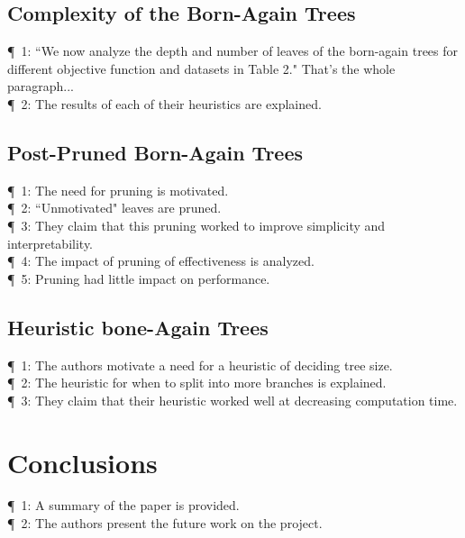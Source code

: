 \documentclass[11pt]{article}
\begin{document}
\subsection{Complexity of the Born-Again Trees}
\P\, 1: ``We now analyze the depth and number of leaves of the born-again trees for different objective function and datasets in Table 2." That's the whole paragraph...\\
\P\, 2: The results of each of their heuristics are explained.
\subsection{Post-Pruned Born-Again Trees}
\P\, 1: The need for pruning is motivated.\\
\P\, 2: ``Unmotivated" leaves are pruned.\\
\P\, 3: They claim that this pruning worked to improve simplicity and interpretability.\\
\P\, 4: The impact of pruning of effectiveness is analyzed.\\
\P\, 5: Pruning had little impact on performance.
\subsection{Heuristic bone-Again Trees}
\P\, 1: The authors motivate a need for a heuristic of deciding tree size.\\
\P\, 2: The heuristic for when to split into more branches is explained.\\
\P\, 3: They claim that their heuristic worked well at decreasing computation time.


\section{Conclusions}
\P\, 1: A summary of the paper is provided.\\
\P\, 2: The authors present the future work on the project.


\vskip 0.2in



\end{document}
